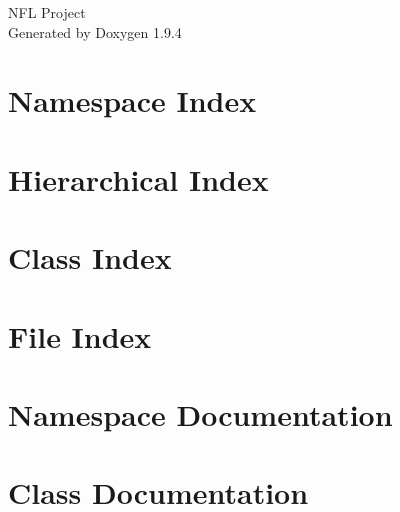 \documentclass[twoside]{book}
\newcommand{\+}{\discretionary{\mbox{\scriptsize$\hookleftarrow$}}{}{}}
\newcommand{\clearemptydoublepage}{%
    \newpage{\pagestyle{empty}\cleardoublepage}%
  }
\begin{document}
  \raggedbottom
    \hypersetup{pageanchor=false,
                bookmarksnumbered=true,
                pdfencoding=unicode
               }
  \begin{titlepage}
  \vspace*{7cm}
  \begin{center}%
  {\Large NFL Project}\\
  \vspace*{1cm}
  {\large Generated by Doxygen 1.9.4}\\
  \end{center}
  \end{titlepage}
  \clearemptydoublepage
  \tableofcontents
  \clearemptydoublepage
  \hypersetup{pageanchor=true}
\chapter{Namespace Index}

\chapter{Hierarchical Index}

\chapter{Class Index}

\chapter{File Index}

\chapter{Namespace Documentation}

\chapter{Class Documentation}
































\end{document}
